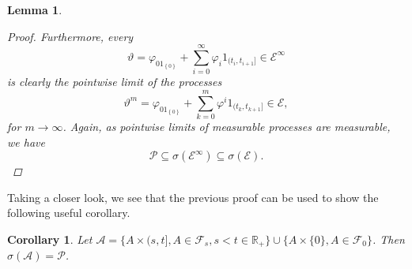 \documentclass[11pt,a4paper,twoside,openany]{report}
\numberwithin{equation}{section}
\theoremstyle{plain} %
\newtheorem{lemma}[theorem]{Lemma}
\newtheorem{corollary}[theorem]{Corollary}
\theoremstyle{definition} %
\theoremstyle{remark} %
\begin{document}
\begin{lemma}
\begin{proof}
 Furthermore, every 
 \begin{equation}\label{eq:approximating adapted left-continuous processes 2}
     \vartheta=\varphi_01_{\left\{0\right\}}+\sum_{i= 0}^\infty \varphi_i1_{(t_i,t_{i+1}]}\in\mathcal{E}^{\infty}
 \end{equation}
 is clearly the pointwise limit of the processes
        \begin{equation*}\label{eq:approximating approximating-sequence of adapted left-continuous processes}
            \vartheta^{m}=\varphi_01_{\left\{0\right\}}+\sum_{k=0}^m\varphi^{i}1_{(t_k,t_{k+1}]}\in\mathcal{E},
        \end{equation*}
        for \(m\to\infty\).
 Again, as pointwise limits of measurable processes are measurable, we have
        \begin{equation*}
        \mathcal{P}\subseteq\sigma(\mathcal{E}^{\infty})\subseteq\sigma(\mathcal{E}).
        \end{equation*}
        \end{proof}
\end{lemma}
Taking a closer look, we see that the previous proof can be used to show the following useful corollary.
\begin{corollary}
    Let \(\mathcal{A}=\{A\times(s,t], A\in\mathcal{F}_s, s<t\in\mathbb{R}_+\}\cup \{A\times \{0\}, A\in\mathcal{F}_0\}\). Then \(\sigma(\mathcal{A})=\mathcal{P}\).
\end{corollary}
\end{document}

